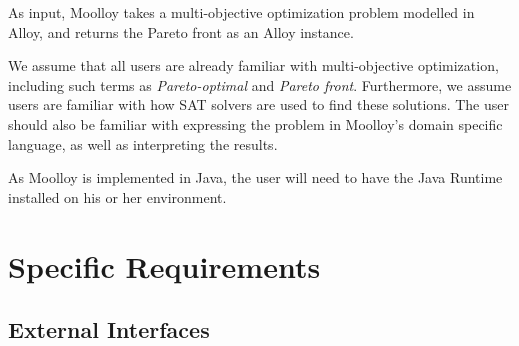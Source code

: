 \documentclass[11pt]{article}
\theoremstyle{definition}
\begin{document}
As input, Moolloy takes a multi-objective optimization problem modelled
in Alloy, and returns the Pareto front as an Alloy instance.


We assume that all users are already familiar with multi-objective
optimization, including such terms as \textit{Pareto-optimal} and
\textit{Pareto front}. Furthermore, we assume users are familiar with
how SAT solvers are used to find these solutions. The user should also
be familiar with expressing the problem in Moolloy's domain specific
language, as well as interpreting the results.



As Moolloy is implemented in Java, the user will need to have the Java
Runtime installed on his or her environment.

\section{Specific Requirements}\label{sec:specific_reqs}

\subsection{External Interfaces}\label{sec:ext_int}
\end{document}

